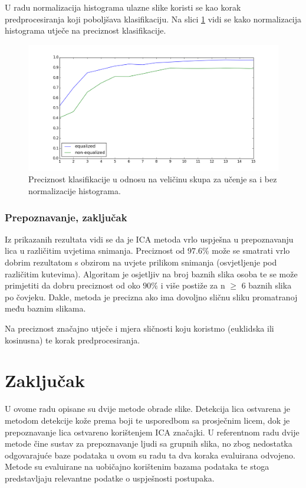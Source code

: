 \documentclass[times, utf8, seminar, numeric]{fer}
\begin{document}
U radu \citep{conf/isda/ChandrappaR12} normalizacija histograma ulazne slike koristi se kao korak predprocesiranja koji poboljšava klasifikaciju. Na slici \ref{fig:eq_noneq_comp} vidi se kako normalizacija histograma utječe na preciznost klasifikacije.

\begin{figure}[!htb]
\centering
\includegraphics[width=\textwidth]{raw/eq_noneq_comp.png}
\caption{Preciznost klasifikacije u odnosu na veličinu skupa za učenje sa i bez normalizacije histograma.}
\label{fig:eq_noneq_comp}
\end{figure}

\subsection{Prepoznavanje, zaključak}

Iz prikazanih rezultata vidi se da je ICA metoda vrlo uspješna u prepoznavanju lica u različitim uvjetima snimanja. Preciznost od $97.6\%$ može se smatrati vrlo dobrim rezultatom s obzirom na uvjete prilikom snimanja (osvjetljenje pod različitim kutevima). Algoritam je osjetljiv na broj baznih slika osoba te se može primjetiti da dobru preciznost od oko $90\%$ i više postiže za n $\geq$ 6 baznih slika po čovjeku. Dakle, metoda je precizna ako ima dovoljno sličnu sliku promatranoj među baznim slikama. 

Na preciznost značajno utječe i mjera sličnosti koju koristmo (euklidska ili kosinusna) te korak predprocesiranja.

\chapter{Zaključak}

U ovome radu opisane su dvije metode obrade slike. Detekcija lica ostvarena je metodom detekcije kože prema boji te usporedbom sa prosječnim licem, dok je prepoznavanje lica ostvareno korištenjem ICA značajki. U referentnom radu \citep{conf/isda/ChandrappaR12} dvije metode čine sustav za prepoznavanje ljudi sa grupnih slika, no zbog nedostatka odgovarajuće baze podataka u ovom su radu ta dva koraka evaluirana odvojeno. Metode su evaluirane na uobičajno korištenim bazama podataka te stoga predstavljaju relevantne podatke o uspješnosti postupaka. 
\end{document}
